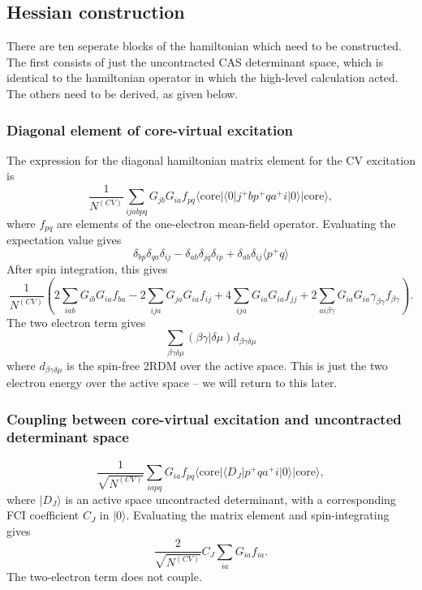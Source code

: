 \documentclass[a4paper,oneside,11pt]{article}
\numberwithin{equation}{section}
\newcommand{\DMETBra}{\langle \mathrm{core}|\langle 0|}
\newcommand{\DMETKet}{|0\rangle| \mathrm{core} \rangle}
\begin{document}
\subsection{Hessian construction}
There are ten seperate blocks of the hamiltonian which need to be constructed. The first consists of just the uncontracted CAS determinant space, which is identical to the hamiltonian operator
in which the high-level calculation acted. The others need to be derived, as given below.
\subsubsection{Diagonal element of core-virtual excitation}
The expression for the diagonal hamiltonian matrix element for the CV excitation is
\begin{equation}
\frac{1}{N^{(CV)}}\sum_{ijabpq} G_{jb} G_{ia} f_{pq} \DMETBra j^{+} b p^{+} q a^{+} i \DMETKet ,
\end{equation}
where $f_{pq}$ are elements of the one-electron mean-field operator. Evaluating the expectation value gives
\begin{equation}
\delta_{bp} \delta_{qa} \delta_{ij} - \delta_{ab} \delta_{jq} \delta_{ip} + \delta_{ab} \delta_{ij} \langle p^{+} q \rangle
\end{equation}
After spin integration, this gives
\begin{equation}
\frac{1}{N^{(CV)}} \left( 2\sum_{iab} G_{ib} G_{ia} f_{ba} - 2\sum_{ija} G_{ja} G_{ia} f_{ij} + 4 \sum_{ija} G_{ia} G_{ia} f_{jj} + 2 \sum_{ai \beta \gamma} G_{ia} G_{ia} \gamma_{\beta \gamma} f_{\beta \gamma} \right) .
\end{equation}
The two electron term gives
\begin{equation}
\sum_{\beta \gamma \delta \mu} (\beta \gamma | \delta \mu) d_{\beta \gamma \delta \mu}
\end{equation}
where $d_{\beta \gamma \delta \mu}$ is the spin-free 2RDM over the active space. This is just the two electron energy over the active space -- we will return to this later.
\subsubsection{Coupling between core-virtual excitation and uncontracted determinant space}
\begin{equation}
\frac{1}{\sqrt{N^{(CV)}}} \sum_{iapq} G_{ia} f_{pq} \langle \textrm{core} |\langle D_J | p^{+} q a^{+} i \DMETKet ,
\end{equation}
where $| D_J \rangle$ is an active space uncontracted determinant, with a corresponding FCI coefficient $C_J$ in $|0\rangle$. Evaluating the matrix element and spin-integrating gives
\begin{equation}
\frac{2}{\sqrt{N^{(CV)}}} C_J \sum_{ia} G_{ia} f_{ia} .
\end{equation}
The two-electron term does not couple.
\end{document}
